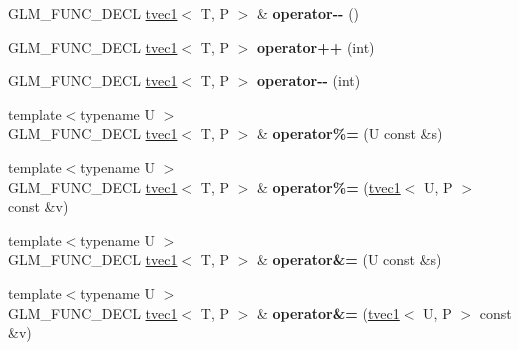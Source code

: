 \begin{DoxyCompactItemize}
\item 
\hypertarget{structglm_1_1detail_1_1tvec1_a777ac8b6fe013405c6015d518a2096a6}{G\-L\-M\-\_\-\-F\-U\-N\-C\-\_\-\-D\-E\-C\-L \hyperlink{structglm_1_1detail_1_1tvec1}{tvec1}$<$ T, P $>$ \& {\bfseries operator-\/-\/} ()}\label{structglm_1_1detail_1_1tvec1_a777ac8b6fe013405c6015d518a2096a6}

\item 
\hypertarget{structglm_1_1detail_1_1tvec1_a215f0e9af490b7cfce0639fc34e67df7}{G\-L\-M\-\_\-\-F\-U\-N\-C\-\_\-\-D\-E\-C\-L \hyperlink{structglm_1_1detail_1_1tvec1}{tvec1}$<$ T, P $>$ {\bfseries operator++} (int)}\label{structglm_1_1detail_1_1tvec1_a215f0e9af490b7cfce0639fc34e67df7}

\item 
\hypertarget{structglm_1_1detail_1_1tvec1_a6fab4adec100e472d3b3d7da65ef2053}{G\-L\-M\-\_\-\-F\-U\-N\-C\-\_\-\-D\-E\-C\-L \hyperlink{structglm_1_1detail_1_1tvec1}{tvec1}$<$ T, P $>$ {\bfseries operator-\/-\/} (int)}\label{structglm_1_1detail_1_1tvec1_a6fab4adec100e472d3b3d7da65ef2053}

\item 
\hypertarget{structglm_1_1detail_1_1tvec1_a744a1362b6f4f9814ac695f7790b3fbf}{{\footnotesize template$<$typename U $>$ }\\G\-L\-M\-\_\-\-F\-U\-N\-C\-\_\-\-D\-E\-C\-L \hyperlink{structglm_1_1detail_1_1tvec1}{tvec1}$<$ T, P $>$ \& {\bfseries operator\%=} (U const \&s)}\label{structglm_1_1detail_1_1tvec1_a744a1362b6f4f9814ac695f7790b3fbf}

\item 
\hypertarget{structglm_1_1detail_1_1tvec1_a99b8f92366abc26677caf3ad5befb4a2}{{\footnotesize template$<$typename U $>$ }\\G\-L\-M\-\_\-\-F\-U\-N\-C\-\_\-\-D\-E\-C\-L \hyperlink{structglm_1_1detail_1_1tvec1}{tvec1}$<$ T, P $>$ \& {\bfseries operator\%=} (\hyperlink{structglm_1_1detail_1_1tvec1}{tvec1}$<$ U, P $>$ const \&v)}\label{structglm_1_1detail_1_1tvec1_a99b8f92366abc26677caf3ad5befb4a2}

\item 
\hypertarget{structglm_1_1detail_1_1tvec1_a641b0025753046a3c2b3c8020cf7d4aa}{{\footnotesize template$<$typename U $>$ }\\G\-L\-M\-\_\-\-F\-U\-N\-C\-\_\-\-D\-E\-C\-L \hyperlink{structglm_1_1detail_1_1tvec1}{tvec1}$<$ T, P $>$ \& {\bfseries operator\&=} (U const \&s)}\label{structglm_1_1detail_1_1tvec1_a641b0025753046a3c2b3c8020cf7d4aa}

\item 
\hypertarget{structglm_1_1detail_1_1tvec1_ab765e86efc8cbb22c6a7d47a136cb64a}{{\footnotesize template$<$typename U $>$ }\\G\-L\-M\-\_\-\-F\-U\-N\-C\-\_\-\-D\-E\-C\-L \hyperlink{structglm_1_1detail_1_1tvec1}{tvec1}$<$ T, P $>$ \& {\bfseries operator\&=} (\hyperlink{structglm_1_1detail_1_1tvec1}{tvec1}$<$ U, P $>$ const \&v)}\label{structglm_1_1detail_1_1tvec1_ab765e86efc8cbb22c6a7d47a136cb64a}


\end{DoxyCompactItemize}
